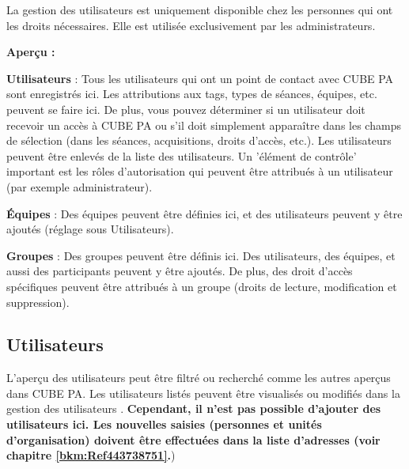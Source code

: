 La gestion des utilisateurs est uniquement disponible chez les personnes qui ont les droits nécessaires. Elle est utilisée exclusivement par les administrateurs.

\vspace{5cm}  

\textbf{Aperçu :}

\vspace{\baselineskip}

\textbf{Utilisateurs} : Tous les utilisateurs qui ont un point de contact avec CUBE PA sont enregistrés ici. Les attributions aux tags, types de séances, équipes, etc. peuvent se faire ici. De plus, vous pouvez déterminer si un utilisateur doit recevoir un accès à CUBE PA ou s'il doit simplement apparaître dans les champs de sélection (dans les séances, acquisitions, droits d'accès, etc.). Les utilisateurs peuvent être enlevés de la liste des utilisateurs. Un 'élément de contrôle' important est les rôles d’autorisation qui peuvent être attribués à un utilisateur (par exemple administrateur).

\vspace{\baselineskip}

\textbf{Équipes} : Des équipes peuvent être définies ici, et des utilisateurs peuvent y être ajoutés (réglage sous Utilisateurs).

\vspace{\baselineskip}

\textbf{Groupes} : Des groupes peuvent être définis ici. Des utilisateurs, des équipes, et aussi des participants peuvent y être ajoutés. De plus, des droit d'accès spécifiques peuvent être attribués à un groupe (droits de lecture, modification et suppression).

\subsection{Utilisateurs}
\label{bkm:Ref445362390}

L'aperçu des utilisateurs peut être filtré ou recherché comme les autres aperçus dans CUBE PA. Les utilisateurs listés peuvent être visualisés ou modifiés dans la gestion des utilisateurs . \textbf{Cependant, il n'est pas possible d'ajouter des utilisateurs ici. Les nouvelles saisies (personnes et unités d'organisation) doivent être effectuées dans la liste d'adresses (voir chapitre \ref{bkm:Ref443738751}.}) \\

\vspace{\baselineskip}

